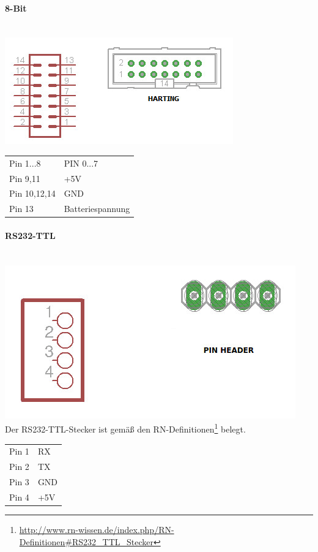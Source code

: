 \documentclass[a4paper,10pt]{article}
\begin{document}
\paragraph{8-Bit} \mbox{} \\
\includegraphics[scale=0.6]{connector_8-bit}
\begin{center}
    \begin{tabular}{| l | l |}
    \hline
    Pin 1...8 	& PIN 0...7 \\ 
    Pin 9,11	& +5V \\
    Pin 10,12,14& GND \\ 
    Pin 13 	& Batteriespannung \\ \hline
    \end{tabular}
\end{center}

\paragraph{RS232-TTL} \mbox{} \\
\includegraphics[scale=0.6]{connector_rs232-ttl} \\
Der RS232-TTL-Stecker ist gemäß den RN-Definitionen\footnote{\url{http://www.rn-wissen.de/index.php/RN-Definitionen\#RS232_TTL_Stecker}} belegt.
\begin{center}
    \begin{tabular}{| l | l |}
    \hline
    Pin 1 	& RX \\ 
    Pin 2	& TX \\
    Pin 3	& GND \\ 
    Pin 4 	& +5V \\ \hline
    \end{tabular}
\end{center}
\end{document}
